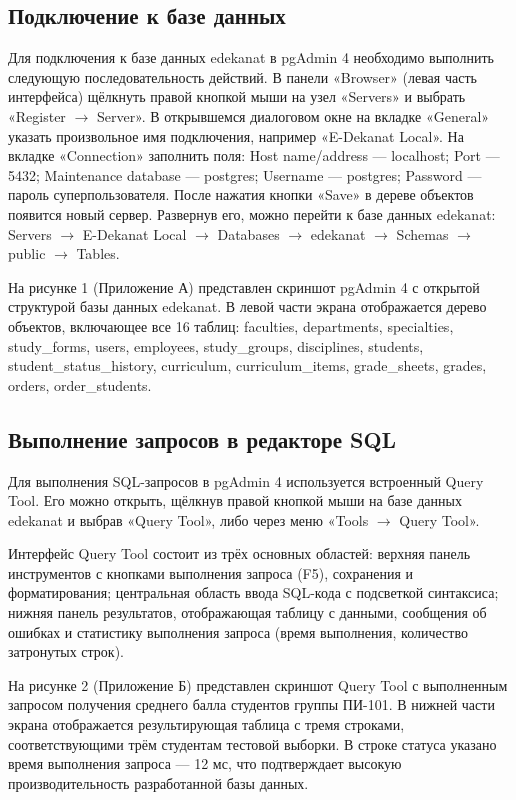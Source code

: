 \documentclass[14pt, a4paper]{extreport}
\begin{document}
\subsection{Подключение к базе данных}
Для подключения к базе данных edekanat в pgAdmin 4 необходимо выполнить следующую последовательность действий. В панели «Browser» (левая часть интерфейса) щёлкнуть правой кнопкой мыши на узел «Servers» и выбрать «Register $\rightarrow$ Server». В открывшемся диалоговом окне на вкладке «General» указать произвольное имя подключения, например «E-Dekanat Local». На вкладке «Connection» заполнить поля: Host name/address --- localhost; Port --- 5432; Maintenance database --- postgres; Username --- postgres; Password --- пароль суперпользователя. После нажатия кнопки «Save» в дереве объектов появится новый сервер. Развернув его, можно перейти к базе данных edekanat: Servers $\rightarrow$ E-Dekanat Local $\rightarrow$ Databases $\rightarrow$ edekanat $\rightarrow$ Schemas $\rightarrow$ public $\rightarrow$ Tables.

На рисунке 1 (Приложение А) представлен скриншот pgAdmin 4 с открытой структурой базы данных edekanat. В левой части экрана отображается дерево объектов, включающее все 16 таблиц: faculties, departments, specialties, study\_forms, users, employees, study\_groups, disciplines, students, student\_status\_history, curriculum, curriculum\_items, grade\_sheets, grades, orders, order\_students.

\subsection{Выполнение запросов в редакторе SQL}
Для выполнения SQL-запросов в pgAdmin 4 используется встроенный Query Tool. Его можно открыть, щёлкнув правой кнопкой мыши на базе данных edekanat и выбрав «Query Tool», либо через меню «Tools $\rightarrow$ Query Tool».

Интерфейс Query Tool состоит из трёх основных областей: верхняя панель инструментов с кнопками выполнения запроса (F5), сохранения и форматирования; центральная область ввода SQL-кода с подсветкой синтаксиса; нижняя панель результатов, отображающая таблицу с данными, сообщения об ошибках и статистику выполнения запроса (время выполнения, количество затронутых строк).

На рисунке 2 (Приложение Б) представлен скриншот Query Tool с выполненным запросом получения среднего балла студентов группы ПИ-101. В нижней части экрана отображается результирующая таблица с тремя строками, соответствующими трём студентам тестовой выборки. В строке статуса указано время выполнения запроса --- 12 мс, что подтверждает высокую производительность разработанной базы данных.
\end{document}
